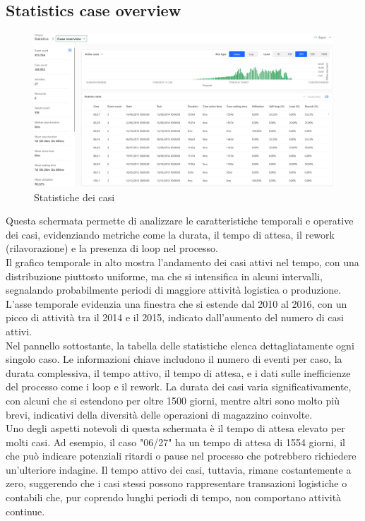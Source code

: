 \documentclass{article}
\begin{document}
\subsection{Statistics case overview}
\begin{figure}[H]
    \centering
    \includegraphics[width=\textwidth]{imgMicrosoft/DatiReali/StatisticsCaseOverviewDatiReali.png}
    \caption{Statistiche dei casi}
    \label{fig:statistics-case-overview}
\end{figure}
Questa schermata permette di analizzare le caratteristiche temporali e operative dei casi, evidenziando metriche come la durata, il tempo di attesa, il rework (rilavorazione) e la presenza di loop nel processo.\\
Il grafico temporale in alto mostra l'andamento dei casi attivi nel tempo, con una distribuzione piuttosto uniforme, ma che si intensifica in alcuni intervalli, segnalando probabilmente periodi di maggiore attività logistica o produzione. L'asse temporale evidenzia una finestra che si estende dal 2010 al 2016, con un picco di attività tra il 2014 e il 2015, indicato dall'aumento del numero di casi attivi.\\
Nel pannello sottostante, la tabella delle statistiche elenca dettagliatamente ogni singolo caso. Le informazioni chiave includono il numero di eventi per caso, la durata complessiva, il tempo attivo, il tempo di attesa, e i dati sulle inefficienze del processo come i loop e il rework. La durata dei casi varia significativamente, con alcuni che si estendono per oltre 1500 giorni, mentre altri sono molto più brevi, indicativi della diversità delle operazioni di magazzino coinvolte.\\
Uno degli aspetti notevoli di questa schermata è il tempo di attesa elevato per molti casi. Ad esempio, il caso "06/27" ha un tempo di attesa di 1554 giorni, il che può indicare potenziali ritardi o pause nel processo che potrebbero richiedere un'ulteriore indagine. Il tempo attivo dei casi, tuttavia, rimane costantemente a zero, suggerendo che i casi stessi possono rappresentare transazioni logistiche o contabili che, pur coprendo lunghi periodi di tempo, non comportano attività continue.\\
\end{document}
